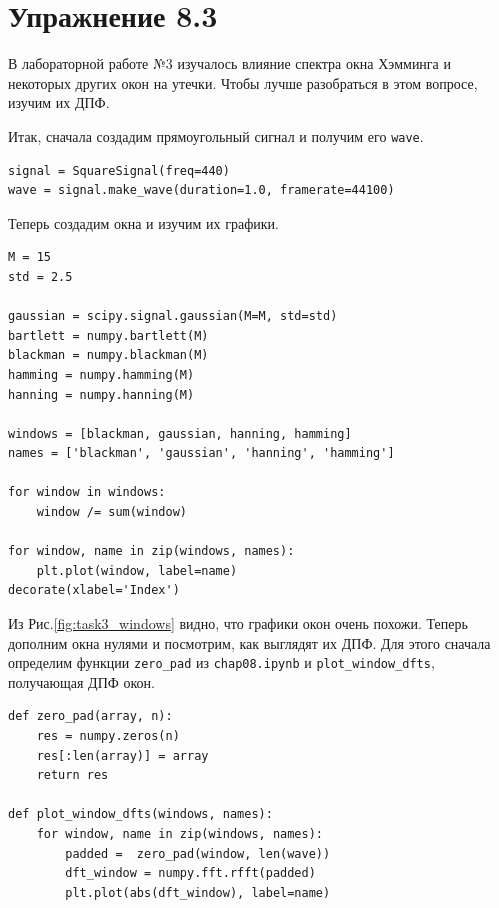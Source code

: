 \documentclass[a4paper, 14pt]{extarticle}
\begin{document}
    \newpage

    \section{Упражнение 8.3}
    \label{sec:task3}

    В лабораторной работе №3 изучалось влияние спектра окна Хэмминга и некоторых других окон на утечки. Чтобы лучше
    разобраться в этом вопросе, изучим их ДПФ.

    Итак, сначала создадим прямоугольный сигнал и  получим его \texttt{wave}.

    \begin{lstlisting}[caption= Создание прямоугольного сигнала., label={lst:task3_square}]
signal = SquareSignal(freq=440)
wave = signal.make_wave(duration=1.0, framerate=44100)  \end{lstlisting}

    Теперь создадим окна и изучим их графики.

    \begin{lstlisting}[caption= Построение графиков окон., label={lst:task3_windows}]
M = 15
std = 2.5

gaussian = scipy.signal.gaussian(M=M, std=std)
bartlett = numpy.bartlett(M)
blackman = numpy.blackman(M)
hamming = numpy.hamming(M)
hanning = numpy.hanning(M)

windows = [blackman, gaussian, hanning, hamming]
names = ['blackman', 'gaussian', 'hanning', 'hamming']

for window in windows:
    window /= sum(window)

for window, name in zip(windows, names):
    plt.plot(window, label=name)
decorate(xlabel='Index')    \end{lstlisting}

    Из Рис.\ref{fig:task3_windows} видно, что графики окон очень похожи. Теперь дополним окна нулями и посмотрим, как
    выглядят их ДПФ. Для этого сначала определим функции \texttt{zero\_pad} из \texttt{chap08.ipynb} и
    \texttt{plot\_window\_dfts}, получающая ДПФ окон.

    \begin{lstlisting}[caption= Функции \texttt{zero\_pad} и  \texttt{plot\_window\_dfts}., label={lst:task3_fun}]
def zero_pad(array, n):
    res = numpy.zeros(n)
    res[:len(array)] = array
    return res

def plot_window_dfts(windows, names):
    for window, name in zip(windows, names):
        padded =  zero_pad(window, len(wave))
        dft_window = numpy.fft.rfft(padded)
        plt.plot(abs(dft_window), label=name)   \end{lstlisting}
\end{document}

